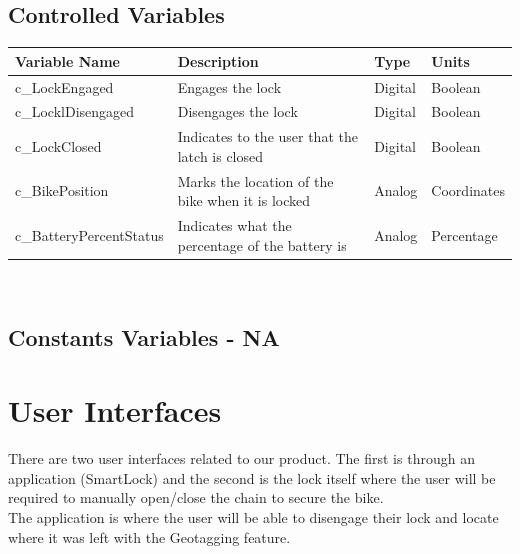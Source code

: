 \documentclass[12pt, titlepage]{article}
\begin{document}
\subsection{Controlled Variables}

\begin{minipage}{\textwidth}
\renewcommand*{\arraystretch}{1.5}
\begin{tabular}{| p{} | p{} | p{} | p{} |}
 \hline
 Variable Name & Description & Type & Units \\ 
 \hline
 c\_LockEngaged & Engages the lock & Digital & Boolean \\ 
  \hline
 c\_LocklDisengaged & Disengages the lock & Digital & Boolean \\ 
  \hline
 c\_LockClosed& Indicates to the user that the latch is closed & Digital & Boolean \\ 
  \hline
 c\_BikePosition & Marks the location of the bike when it is locked & Analog & Coordinates \\ 
  \hline
 c\_BatteryPercentStatus & Indicates what the percentage of the battery is & Analog & Percentage \\ 
 \hline
\end{tabular}
\end{minipage}\\

\subsection{Constants Variables - NA}

\newpage
\section{User Interfaces}
There are two user interfaces related to our product. The first is through an application (SmartLock) and the second is the lock itself where the user will be required to manually open/close the chain to secure the bike. \\


The application is where the user will be able to disengage their lock and locate where it was left with the Geotagging feature. \\
\end{document}
